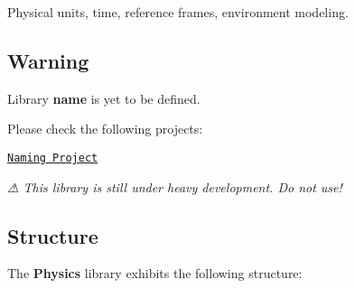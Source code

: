 Physical units, time, reference frames, environment modeling.

\href{https://travis-ci.com/open-space-collective/library-physics}{\tt } \href{https://codecov.io/gh/open-space-collective/library-physics}{\tt } \href{https://open-space-collective.github.io/library-physics}{\tt } \href{https://badge.fury.io/gh/open-space-collective%2Flibrary-physics}{\tt } \href{https://badge.fury.io/py/LibraryPhysicsPy}{\tt } \href{https://opensource.org/licenses/Apache-2.0}{\tt }

\subsection*{Warning}

Library {\bfseries name} is yet to be defined.

Please check the following projects\+:


\begin{DoxyItemize}
\item \href{https://github.com/orgs/open-space-collective/projects/1}{\tt Naming Project}
\end{DoxyItemize}

{\itshape ⚠ This library is still under heavy development. Do not use!}

\subsection*{Structure}

The {\bfseries Physics} library exhibits the following structure\+:


